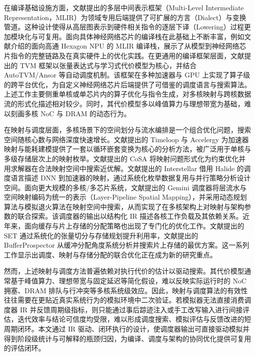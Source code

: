 在编译基础设施方面，文献\parencite{lattner2021mlir}提出的多层中间表示框架（Multi-Level Intermediate Representation，MLIR）为领域专用后端提供了可扩展的方言（Dialect）与变换管道。这种设计使得从高层图表示到硬件相关指令的逐层下译（Lowering）过程更加模块化与可复用。面向具体神经网络芯片的编译栈在此基础上不断丰富，例如文献\parencite{qualcomm2026hexagonmlir}介绍的面向高通 Hexagon NPU 的 MLIR 编译栈，展示了从模型到神经网络芯片指令的完整链路及在真实硬件上的优化实践。在更通用的编译框架层面，文献\parencite{chen2018tvm}提出的 TVM 框架以张量表达式与学习式代价模型为核心，并结合 AutoTVM/Ansor 等自动调度机制。该框架在多种加速器与 GPU 上实现了算子级的跨平台优化，为自定义神经网络芯片后端提供了可借鉴的调度语言与搜索算法。上述工作主要侧重单核或单芯片内的算子优化与指令生成，对多核映射与跨核数据流的形式化描述相对较少。同时，其代价模型多以峰值算力与理想带宽为基础，难以刻画多核 NoC 与 DRAM 的动态行为。

在映射与调度层面，多核场景下的空间划分与流水编排是一个组合优化问题，搜索空间随核心数与网络深度快速增长。文献\parencite{parashar2019timeloop,wu2019accelergy}提出的 Timeloop 与 Accelergy 为加速器映射与能耗建模提供了一套以循环嵌套变换为核心的分析方法，被广泛用于单核与多级存储层次上的映射枚举。文献\parencite{huang2021cosa}提出的 CoSA 将映射问题形式化为约束优化并用求解器在合法映射空间中搜索近优解。文献\parencite{yang2020interstellar}提出的 Interstellar 借用 Halide 的调度语言描述 DNN 到加速器的映射，通过系统化枚举数据复用与并行策略分析设计空间。面向更大规模的多核/多芯片系统，文献\parencite{cai2024gemini}提出的 Gemini 调度器将层流水与空间映射编码为统一的表示（Layer-Pipeline Spatial Mapping），并采用动态规划算法与模拟退火算法在映射空间中搜索，从而实现了在多核架构上对映射与架构参数的联合探索。该调度器的输出以结构化 IR 描述各核工作负载及其依赖关系。近年来，面向缓存与片上存储的分配策略也出现了专门化的优化工作。文献\parencite{set2023isca}提出的 SET 通过系统化的张量切分与存储规划提升利用率，文献\parencite{bufferprospector2024}提出的 BufferProspector 从缓冲分配角度系统分析并搜索片上存储的最优方案。这一系列工作显示出调度、映射与存储分配的联合优化正在成为新的研究重点。

然而，上述映射与调度方法普遍依赖对执行代价的估计以驱动搜索。其代价模型通常基于峰值算力、理想带宽与固定延迟等简化假设，难以反映实际运行时的 NoC 拥塞、DRAM 排队与行冲突等多核系统级效应。因此，映射与调度算法的有效性往往需要在更贴近真实系统行为的模拟环境中二次验证。若模拟器无法直接消费调度器 IR 并反馈周期级指标，则只能通过事后踪迹注入或手工改写输入进行间接评估，迭代效率与结论可信度均受限，难以形成调度搜索、模拟评估与反馈改进的短周期闭环。本文通过 IR 驱动、闭环执行的设计，使调度器输出可直接驱动模拟并得到阶段级统计与可解释的瓶颈归因，为编译、调度与架构的协同优化提供可复用的评估闭环。

